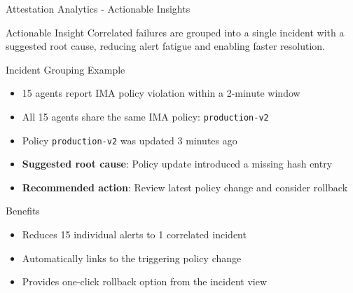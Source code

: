 \begin{frame}{Attestation Analytics - Actionable Insights}
  \begin{alertblock}{Actionable Insight}
    \scriptsize
    Correlated failures are grouped into a single incident with a suggested root cause,
    reducing alert fatigue and enabling faster resolution.
  \end{alertblock}

  \vspace{0.3cm}

  \begin{block}{Incident Grouping Example}
    \scriptsize
    \begin{itemize}
      \item 15 agents report \textcolor{dangered}{IMA policy violation} within a 2-minute window
      \item All 15 agents share the same IMA policy: \texttt{production-v2}
      \item Policy \texttt{production-v2} was updated 3 minutes ago
      \item \textbf{Suggested root cause}: Policy update introduced a missing hash entry
      \item \textbf{Recommended action}: Review latest policy change and consider rollback
    \end{itemize}
  \end{block}

  \vspace{0.3cm}

  \begin{exampleblock}{Benefits}
    \scriptsize
    \begin{itemize}
      \item Reduces 15 individual alerts to 1 correlated incident
      \item Automatically links to the triggering policy change
      \item Provides one-click rollback option from the incident view
    \end{itemize}
  \end{exampleblock}
\end{frame}

